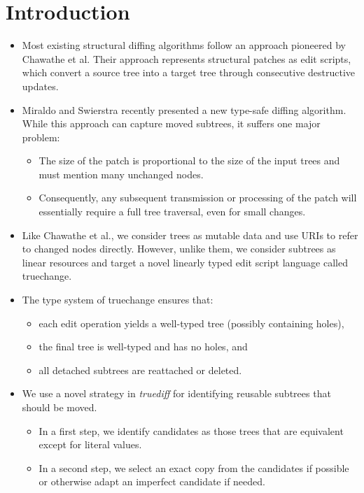 \section{Introduction}
\begin{itemize}
    \item Most existing structural diffing algorithms follow an approach pioneered by Chawathe et al. Their approach represents structural patches as edit scripts, which convert a source tree into a target tree through consecutive destructive updates.
    \item Miraldo and Swierstra recently presented a new type-safe diffing algorithm. While this approach can capture moved subtrees, it suffers one major problem:
    \begin{itemize}
        \item The size of the patch is proportional to the size of the input trees and must mention many unchanged nodes.
        \item Consequently, any subsequent transmission or processing of the patch will essentially require a full tree traversal, even for small changes.
    \end{itemize}
    \item Like Chawathe et al., we consider trees as mutable data and use URIs to refer to changed nodes directly. However, unlike them, we consider subtrees as linear resources and target a novel linearly typed edit script language called truechange.
    \item The type system of truechange ensures that: 
    \begin{itemize}
        \item each edit operation yields a well-typed tree (possibly containing holes), 
        \item the final tree is well-typed and has no holes, and 
        \item all detached subtrees are reattached or deleted.
    \end{itemize}
    \item We use a novel strategy in \textit{truediff} for identifying reusable subtrees that should be moved. 
    \begin{itemize}
        \item In a first step, we identify candidates as those trees that are equivalent except for literal values.
        \item In a second step, we select an exact copy from the candidates if possible or otherwise adapt an imperfect candidate if needed.

\end{itemize}
\end{itemize}
